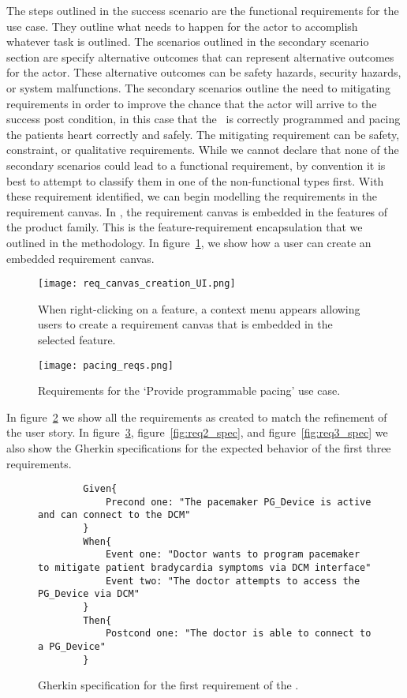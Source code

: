 The steps outlined in the success scenario are the functional requirements for the use case. They outline what needs to happen for the actor to accomplish whatever task is outlined. The scenarios outlined in the secondary scenario section are specify alternative outcomes that can represent alternative outcomes for the actor. These alternative outcomes can be safety hazards, security hazards, or system malfunctions. The secondary scenarios outline the need to mitigating requirements in order to improve the chance that the actor will arrive to the success post condition, in this case that the \pgd\ is correctly programmed and pacing the patients heart correctly and safely. The mitigating requirement can be safety, constraint, or qualitative requirements. While we cannot declare that none of the secondary scenarios could lead to a functional requirement, by convention it is best to attempt to classify them in one of the non-functional types first. With these requirement identified, we can begin modelling the requirements in the requirement canvas. In \tool, the requirement canvas is embedded in the features of the product family. This is the feature-requirement encapsulation that we outlined in the methodology. In figure~\ref{fig:req_canvas_creation_UI}, we show how a user can create an embedded requirement canvas.

\begin{figure}
	\centering
	\texttt{[image: req\_canvas\_creation\_UI.png]}
	\caption{When right-clicking on a feature, a context menu appears allowing users to create a requirement canvas that is embedded in the selected feature.}
	\label{fig:req_canvas_creation_UI}
\end{figure}

\begin{figure}
	\centering
	\texttt{[image: pacing\_reqs.png]}
	\caption{Requirements for the `Provide programmable pacing' use case.}
	\label{fig:pacing_reqs}
\end{figure}

In figure~\ref{fig:pacing_reqs} we show all the requirements as created to match the refinement of the user story. In figure~\ref{fig:req1_spec}, figure~\ref{fig:req2_spec}, and figure~\ref{fig:req3_spec} we also show the Gherkin specifications for the expected behavior of the first three requirements.

\begin{figure}
	\begin{lstlisting}
		Given{
			Precond one: "The pacemaker PG_Device is active and can connect to the DCM"
		}
		When{
			Event one: "Doctor wants to program pacemaker to mitigate patient bradycardia symptoms via DCM interface"
			Event two: "The doctor attempts to access the PG_Device via DCM"
		}
		Then{
			Postcond one: "The doctor is able to connect to a PG_Device"
		}
	\end{lstlisting}
	\caption{Gherkin specification for the first requirement of the \pgd.}
	\label{fig:req1_spec}
\end{figure}

